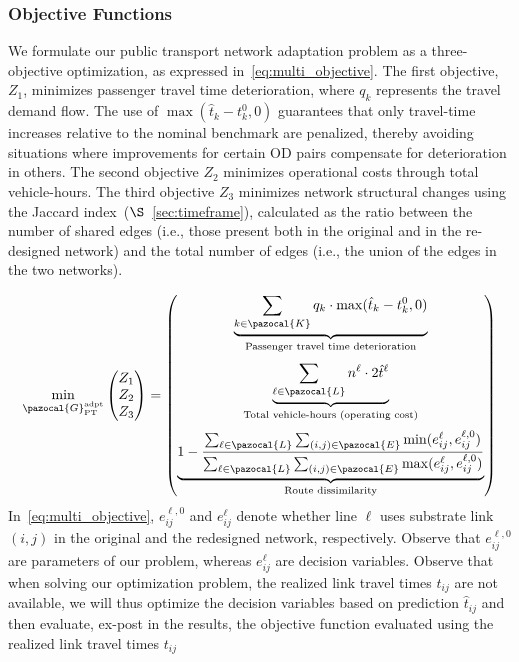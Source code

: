 \documentclass[a4paper,fleqn]{cas-sc}
\begin{document}
\subsubsection{Objective Functions}\label{sec:obj}
We formulate our public transport network adaptation problem as a three-objective optimization, as expressed in~\eqref{eq:multi_objective}. The first objective, $Z_1$, minimizes passenger travel time deterioration, where $q_k$ represents the travel demand flow. 
The use of $\max(\hat{t}_k - t_k^0, 0)$ guarantees that only travel-time increases relative to the nominal benchmark are penalized, thereby avoiding situations where improvements for certain OD pairs compensate for deterioration in others. 
%
The second objective $Z_2$ minimizes operational costs through total vehicle-hours.
%
The third objective $Z_3$ minimizes network structural changes using the Jaccard index~($\S$~\ref{sec:timeframe}), calculated as the ratio between the number of shared edges (i.e., those present both in the original and in the re-designed network) and the total number of edges (i.e., the union of the edges in the two networks). 

\begin{equation}
\label{eq:multi_objective}
\min_{\pazocal{G}_{\text{PT}}^{\text{adpt}}} \begin{pmatrix} Z_1 \\ Z_2 \\ Z_3 \end{pmatrix} = \begin{pmatrix}
\underbrace{\sum_{k \in \pazocal{K}} q_k \cdot \max(\hat{t}_k - t_k^0, 0)}_{\text{Passenger travel time deterioration}} \\[8ex]
\underbrace{\sum_{\ell \in \pazocal{L}} n^\ell \cdot 2\hat{t}^\ell}_{\text{Total vehicle-hours (operating cost)}} \\[8ex]
\underbrace{1 - \frac{\sum_{\ell \in \pazocal{L}} \sum_{(i,j) \in \pazocal{E}} \min(e_{ij}^\ell, e_{ij}^{\ell, 0})}{\sum_{\ell \in \pazocal{L}} \sum_{(i,j) \in \pazocal{E}} \max(e_{ij}^\ell, e_{ij}^{\ell, 0})}}_{\text{Route dissimilarity}}
\end{pmatrix}
\end{equation}
In~\eqref{eq:multi_objective}, $e_{ij}^{\ell, 0}$ and $e_{ij}^\ell$ denote whether line $\ell$ uses substrate link $(i, j)$ in the original and the redesigned network, respectively. Observe that $e_{ij}^{\ell, 0}$ are parameters of our problem, whereas $e_{ij}^\ell$ are decision variables. 
%
Observe that when solving our optimization problem, the realized link travel times $t_{ij}$ are not available, we will thus optimize the decision variables based on prediction $\hat{t}_{ij}$ and then evaluate, ex-post in the results, the objective function evaluated using the realized link travel times $t_{ij}$
\end{document}
